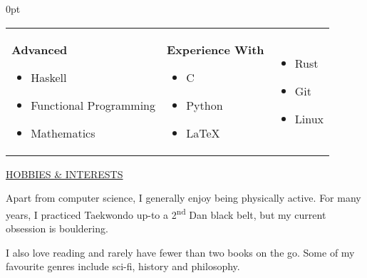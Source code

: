 \documentclass{article}
\newenvironment{tight-list}[1]{
  \vspace{5pt}
  \begin{adjustwidth}{15pt}{0pt}
  \begin{itemize}
    \setlength{\itemsep}{#1}
    \setlength{\parskip}{0pt}
    \setlength{\parsep}{0pt} 
}
{
  \end{itemize}
  \end{adjustwidth}
  \vspace{15pt}
}
\begin{document}
\begin{tight-list}{0pt}
\item[]
\begin{tabular}{p{}p{}p{}}
  \raggedright{}
  \textbf{Advanced}
  \begin{itemize}
    \item Haskell
    \item Functional Programming
    \item Mathematics
  \end{itemize}

   &
  \raggedright{}
  \textbf{Experience With}
  \begin{itemize}
    \item C
    \item Python
    \item \LaTeX{}
  \end{itemize}

   &
  \raggedright{}
  \begin{itemize}
    \item Rust
    \item Git
    \item Linux
  \end{itemize}
\end{tabular}
\vspace{-10pt}
\end{tight-list}

\vspace{5pt}

\uline{{\large HOBBIES \& INTERESTS}\hfill}
\vspace{10pt}

\begin{adjustwidth}{15pt}{0pt}
  Apart from computer science, I generally enjoy being physically active.
  For many years, I practiced Taekwondo up-to a 2\textsuperscript{nd} Dan black belt, but my current obsession is bouldering.

  I also love reading and rarely have fewer than two books on the go.
  Some of my favourite genres include sci-fi, history and philosophy.
\end{adjustwidth}
\end{document}
